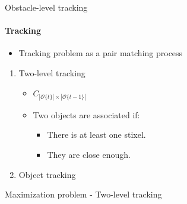 \begin{frame}[plain]{Obstacle-level tracking}
  \framesubtitle{Tracking}
  \begin{itemize}
   \item <1-> Tracking problem as a pair matching process
  \end{itemize}
  \begin{enumerate}
   \item<2-> Two-level tracking
   \begin{itemize}
    \item<4-> $C_{|\mathcal{O}\{t\}| \times |\mathcal{O}\{t - 1\}|}$
    \item<4-> Two objects are associated if:
    \begin{itemize}
     \item<4-> There is at least one stixel.
     \item<4-> They are close enough.
    \end{itemize}
   \end{itemize}
   \item<3-> Object tracking
  \end{enumerate}
  \begin{overlayarea}{\textwidth}{\textheight}
   {
    \vskip-1.0cm
    \begin{block}{}
    \vskip-0.4cm
    \begin{algorithm}[H]
    \begin{algorithmic}[1]
    \footnotesize
	  \EndIf
	\EndFor
      \EndFor
    \EndFunction
    \end{algorithmic}
    \end{algorithm}
    \end{block}
  }
   {
    \vskip-2.0cm
    \begin{block}{Maximization problem - Two-level tracking}
      \begin{center}

\end{center}
\end{block}}
\end{overlayarea}
\end{frame}
